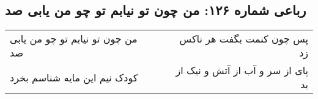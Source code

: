 \begin{center}
\section*{رباعی شماره ۱۲۶: من چون تو نیابم تو چو من یابی صد}
\label{sec:sh126}
\begin{longtable}{l p{0.5cm} r}
من چون تو نیابم تو چو من یابی صد
&&
پس چون کنمت بگفت هر ناکس زد
\\
کودک نیم این مایه شناسم بخرد
&&
پای از سر و آب از آتش و نیک از بد
\\
\end{longtable}
\end{center}

